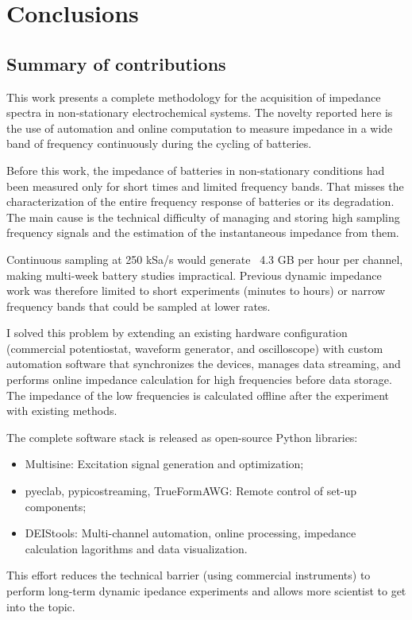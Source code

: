 \chapter{Conclusions}

\section{Summary of contributions}
This work presents a complete methodology for the acquisition of impedance spectra in non-stationary electrochemical systems. The novelty reported here is the use of automation and online computation to measure impedance in a wide band of frequency continuously during the cycling of batteries.

Before this work, the impedance of batteries in non-stationary conditions had been measured only for short times and limited frequency bands. That misses the characterization of the entire frequency response of batteries or its degradation. The main cause is the technical difficulty of managing and storing high sampling frequency signals and the estimation of the instantaneous impedance from them.

Continuous sampling at 250 kSa/s would generate ~4.3 GB per hour per channel, making multi-week battery studies impractical. Previous dynamic impedance work was therefore limited to short experiments (minutes to hours) or narrow frequency bands that could be sampled at lower rates.

I solved this problem by extending an existing hardware configuration (commercial potentiostat, waveform generator, and oscilloscope) with custom automation software that synchronizes the devices, manages data streaming, and performs online impedance calculation for high frequencies before data storage. The impedance of the low frequencies is calculated offline after the experiment with existing methods.

The complete software stack is released as open-source Python libraries:
\begin{itemize}
\item Multisine: Excitation signal generation and optimization; 
\item pyeclab, pypicostreaming, TrueFormAWG: Remote control of set-up components;
\item DEIStools: Multi-channel automation, online processing, impedance calculation lagorithms and data visualization.
\end{itemize}
This effort reduces the technical barrier (using commercial instruments) to perform long-term dynamic ipedance experiments and allows more scientist to get into the topic.


